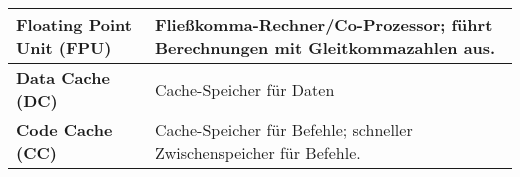 \documentclass[asp1.tex]{subfiles}
\begin{document}
\begin{table}[H]
\begin{tabular}{|p{}|p{}|}
        \\\hline

        \textbf{Floating Point Unit (FPU)}     & Fließkomma-Rechner/Co-Prozessor; führt Berechnungen mit Gleitkommazahlen aus.

        \\\hline

        \textbf{Data Cache (DC)}               & Cache-Speicher für Daten

        \\\hline

        \textbf{Code Cache (CC)}               & Cache-Speicher für Befehle; schneller Zwischenspeicher für Befehle.

        \\\hline
    \end{tabular}
\end{table}

\break
\end{document}
